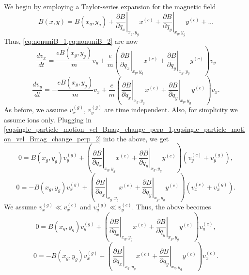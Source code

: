 \documentclass[oneside,a4paper,11pt]{report}
\begin{document}
We begin by employing a Taylor-series expansion for the magnetic field
\begin{equation}
    B(x,y) = B(x_g, y_g) + \left . \frac{\partial B}{\partial q_x} \right |_{x_g,y_g} x^{(c)} + \left . \frac{\partial B}{\partial q_y} \right |_{x_g,y_g} y^{(c)} + ...
\end{equation}
Thus, \cref{eq:nonuniB_1,eq:nonuniB_2} are now
\begin{equation}
    \frac{ d v_x}{dt} = \frac{e B(x_g,y_g)}{m} v_y + \frac{e}{m} \left ( \left . \frac{\partial B}{\partial q_x} \right|_{x_g,y_g} x^{(c)} + \left . \frac{\partial B}{\partial q_y} \right |_{x_g,y_g} y^{(c)} \right) v_y
\end{equation}
\begin{equation}
    \frac{ d v_y}{dt} = -\frac{e B(x_g,y_g)}{m} v_x + \frac{e}{m} \left ( \left . \frac{\partial B}{\partial q_x} \right|_{x_g,y_g} x^{(c)} + \left . \frac{\partial B}{\partial q_y} \right |_{x_g,y_g} y^{(c)} \right ) v_x.
\end{equation}
As before, we assume $v_x^{(g)}$, $v_y^{(g)}$ are time independent. Also, for simplicity we assume ions only. Plugging in \cref{eq:single_particle_motion_vel_Bmag_change_perp_1,eq:single_particle_motion_vel_Bmag_change_perp_2} into the above, we get
\begin{equation}
    0 = B(x_g,y_g) v_y^{(g)} + \left ( \left . \frac{\partial B}{\partial q_x} \right|_{x_g,y_g} x^{(c)} + \left . \frac{\partial B}{\partial q_y} \right |_{x_g,y_g} y^{(c)} \right) \left ( v_y^{(c)} + v_y^{(g)} \right),
\end{equation}
\begin{equation}
    0 = -B(x_g,y_g) v_x^{(g)} + \left ( \left . \frac{\partial B}{\partial q_x} \right|_{x_g,y_g} x^{(c)} + \left . \frac{\partial B}{\partial q_y} \right |_{x_g,y_g} y^{(c)} \right ) \left ( v_x^{(c)} + v_x^{(g)} \right ).
\end{equation}
We assume $v_x^{(g)} \ll v_x^{(c)}$ and $v_y^{(g)} \ll v_y^{(c)}$. Thus, the above becomes
\begin{equation}
    \label{eq:single_particle_motion_Bmag_change_perp_temp1}
    0 = B(x_g,y_g) v_y^{(g)} + \left ( \left . \frac{\partial B}{\partial q_x} \right|_{x_g,y_g} x^{(c)} + \left . \frac{\partial B}{\partial q_y} \right |_{x_g,y_g} y^{(c)} \right) v_y^{(c)},
\end{equation}
\begin{equation}
    \label{eq:single_particle_motion_Bmag_change_perp_temp2}
    0 = -B(x_g,y_g) v_x^{(g)} + \left ( \left . \frac{\partial B}{\partial q_x} \right|_{x_g,y_g} x^{(c)} + \left . \frac{\partial B}{\partial q_y} \right |_{x_g,y_g} y^{(c)} \right ) v_x^{(c)}.
\end{equation}
\end{document}
